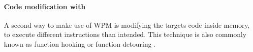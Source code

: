 \paragraph{Code modification with }
A second way to make use of \gls{WPM} is modifying the targets code inside memory, to execute different instructions than intended. This technique is also commonly known as function hooking or function detouring \cite{codeproject_hooking}.